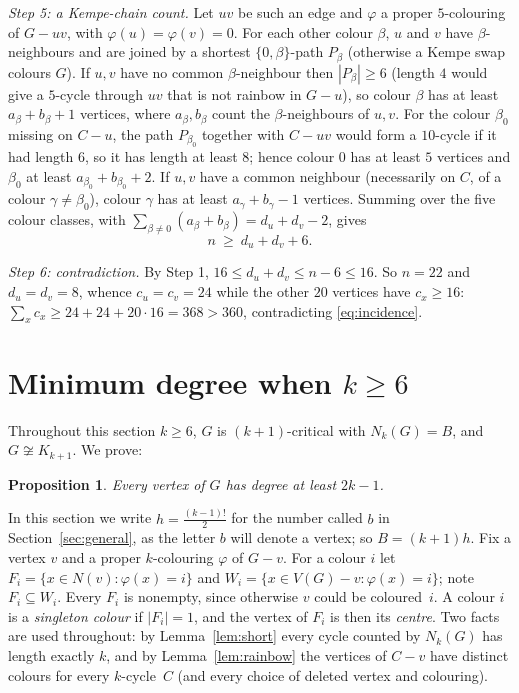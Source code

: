 \documentclass[11pt]{article}
\newtheorem{proposition}{Proposition}
\theoremstyle{remark}
\begin{document}
\emph{Step 5: a Kempe-chain count.} Let $uv$ be such an edge and $\varphi$ a
proper $5$-colouring of $G-uv$, with $\varphi(u)=\varphi(v)=0$. For each other
colour $\beta$, $u$ and $v$ have $\beta$-neighbours and are joined by a shortest
$\{0,\beta\}$-path $P_\beta$ (otherwise a Kempe swap colours $G$). If $u,v$ have
no common $\beta$-neighbour then $|P_\beta|\ge6$ (length $4$ would give a
$5$-cycle through $uv$ that is not rainbow in $G-u$), so colour $\beta$ has at
least $a_\beta+b_\beta+1$ vertices, where $a_\beta,b_\beta$ count the
$\beta$-neighbours of $u,v$. For the colour $\beta_0$ missing on $C-u$, the path
$P_{\beta_0}$ together with $C-uv$ would form a $10$-cycle if it had length $6$,
so it has length at least $8$; hence colour $0$ has at least $5$ vertices and
$\beta_0$ at least $a_{\beta_0}+b_{\beta_0}+2$. If $u,v$ have a common
neighbour (necessarily on $C$, of a colour $\gamma\ne\beta_0$), colour $\gamma$
has at least $a_\gamma+b_\gamma-1$ vertices. Summing over the five colour
classes, with $\sum_{\beta\ne0}(a_\beta+b_\beta)=d_u+d_v-2$, gives
\[
n\ \ge\ d_u+d_v+6 .
\]

\emph{Step 6: contradiction.} By Step 1, $16\le d_u+d_v\le n-6\le16$. So
$n=22$ and $d_u=d_v=8$, whence $c_u=c_v=24$ while the other $20$ vertices have
$c_x\ge16$: $\sum_x c_x\ge24+24+20\cdot16=368>360$, contradicting
\eqref{eq:incidence}.


\section{Minimum degree when $k\ge6$}\label{sec:six}

Throughout this section $k\ge6$, $G$ is $(k+1)$-critical with $N_k(G)=B$, and
$G\not\cong K_{k+1}$. We prove:

\begin{proposition}\label{prop:mindeg}
Every vertex of $G$ has degree at least $2k-1$.
\end{proposition}

In this section we write $h=\frac{(k-1)!}{2}$ for the number called $b$ in
Section~\ref{sec:general}, as the letter $b$ will denote a vertex; so
$B=(k+1)h$. Fix a vertex $v$ and a proper $k$-colouring $\varphi$ of $G-v$. For a colour
$i$ let $F_i=\{x\in N(v):\varphi(x)=i\}$ and
$W_i=\{x\in V(G)-v:\varphi(x)=i\}$; note $F_i\subseteq W_i$. Every $F_i$ is
nonempty, since otherwise $v$ could be coloured~$i$. A colour $i$ is a
\emph{singleton colour} if $|F_i|=1$, and the vertex of $F_i$ is then its
\emph{centre}. Two facts are used throughout: by Lemma~\ref{lem:short} every
cycle counted by $N_k(G)$ has length exactly $k$, and by
Lemma~\ref{lem:rainbow} the vertices of $C-v$ have distinct colours for every
$k$-cycle~$C$ (and every choice of deleted vertex and colouring).
\end{document}
